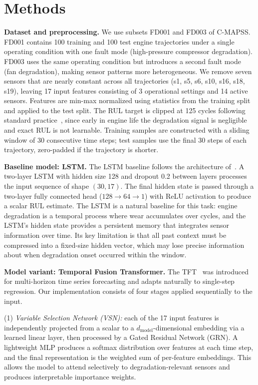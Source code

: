 \documentclass{article}
\begin{document}
\section{Methods}

\textbf{Dataset and preprocessing.}
We use subsets FD001 and FD003 of C-MAPSS. FD001 contains 100 training and 100 test engine trajectories under a single operating condition with one fault mode (high-pressure compressor degradation). FD003 uses the same operating condition but introduces a second fault mode (fan degradation), making sensor patterns more heterogeneous. We remove seven sensors that are nearly constant across all trajectories (s1, s5, s6, s10, s16, s18, s19), leaving 17 input features consisting of 3 operational settings and 14 active sensors. Features are min-max normalized using statistics from the training split and applied to the test split. The RUL target is clipped at 125 cycles following standard practice~\cite{zheng2017}, since early in engine life the degradation signal is negligible and exact RUL is not learnable. Training samples are constructed with a sliding window of 30 consecutive time steps; test samples use the final 30 steps of each trajectory, zero-padded if the trajectory is shorter.

\textbf{Baseline model: LSTM.}
The LSTM baseline follows the architecture of~\cite{zheng2017}. A two-layer LSTM with hidden size 128 and dropout 0.2 between layers processes the input sequence of shape $(30, 17)$. The final hidden state is passed through a two-layer fully connected head ($128 \to 64 \to 1$) with ReLU activation to produce a scalar RUL estimate. The LSTM is a natural baseline for this task: engine degradation is a temporal process where wear accumulates over cycles, and the LSTM's hidden state provides a persistent memory that integrates sensor information over time. Its key limitation is that all past context must be compressed into a fixed-size hidden vector, which may lose precise information about when degradation onset occurred within the window.

\textbf{Model variant: Temporal Fusion Transformer.}
The TFT~\cite{lim2021} was introduced for multi-horizon time series forecasting and adapts naturally to single-step regression. Our implementation consists of four stages applied sequentially to the input.

(1) \textit{Variable Selection Network (VSN):} each of the 17 input features is independently projected from a scalar to a $d_\text{model}$-dimensional embedding via a learned linear layer, then processed by a Gated Residual Network (GRN). A lightweight MLP produces a softmax distribution over features at each time step, and the final representation is the weighted sum of per-feature embeddings. This allows the model to attend selectively to degradation-relevant sensors and produces interpretable importance weights.
\end{document}
